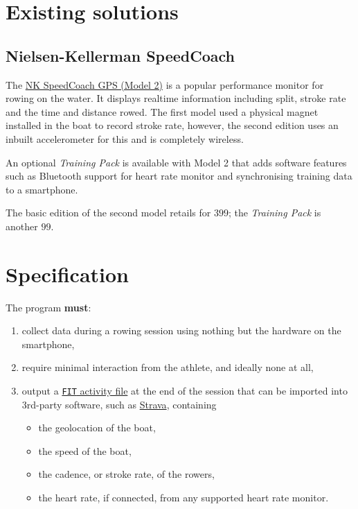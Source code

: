 \documentclass[11pt,twoside,a4paper]{report}
\begin{document}
\section{Existing solutions}

\subsection{Nielsen-Kellerman SpeedCoach}

The \href{https://nksports.com/speedcoach-gps-2}{NK SpeedCoach \rightsreserved GPS (Model 2)} is a popular performance monitor for rowing on the water. 
It displays realtime information including split, stroke rate and the time and distance rowed. 
The first model used a physical magnet installed in the boat to record stroke rate, however, the second edition uses an inbuilt accelerometer for this and is completely wireless. 

An optional \textit{Training Pack} is available with Model 2 that adds software features such as Bluetooth support for heart rate monitor and synchronising training data to a smartphone.

The basic edition of the second model retails for \textsterling $399$; the \textit{Training Pack} is another \textsterling $99$.

\section{Specification}

The program \textbf{must}:
\begin{enumerate}
  \item collect data during a rowing session using nothing but the hardware on the smartphone,
  \item require minimal interaction from the athlete, and ideally none at all,
  \item output a \href{https://developer.garmin.com/fit/file-types/activity/}{\texttt{FIT} activity file} at the end of the session that can be imported into 3rd-party software, such as \href{https://strava.com}{Strava}, containing
  \begin{itemize}
    \item the geolocation of the boat,
    \item the speed of the boat,
    \item the cadence, or stroke rate, of the rowers,
    \item the heart rate, if connected, from any supported heart rate monitor.
  \end{itemize}
\end{enumerate}
\end{document}
